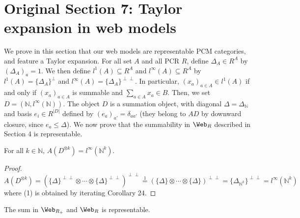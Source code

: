 \section*{Original Section 7: Taylor expansion in web models}
We prove in this section that our web models are representable PCM categories, and feature a Taylor expansion. For all set $A$ and all PCR $R$, define $\Delta_A\in R^A$ by $(\Delta_A)_a=1$. We then define $l^1(A)\subseteq R^A$ and $l^\infty(A)\subseteq R^A$ by $l^1(A)=\{\Delta_A\}^\perp$ and $l^\infty(A)=\{\Delta_A\}^{\perp\perp}$. In particular, $(x_a)_{a\in A}\in l^1(A)$ if and only if $(x_a)_{a\in A}$ is summable and $\sum_{a\in A}x_a\in B$. Then, we set $D=(\mathbb N,l^\infty(\mathbb N))$.
The object $D$ is a summation object, with diagonal $\Delta=\Delta_{\mathbb N}$ and basis $e_i\in R^{|D|}$ defined by $(e_a)_{a'}=\delta_{aa'}$ (they belong to $AD$ by downward closure, since $e_a\leq\Delta$). We now prove that the summability in $\Web_R$ described in Section 4 is representable.
\begin{originallemma}[58] For all $k\in\mathbb N$, $A(D^{\otimes k})=l^\infty(\mathbb N^k)$.\end{originallemma}
\begin{proof}$A(D^{\otimes k})=(\{\Delta\}^{\perp\perp}\otimes\cdots\otimes\{\Delta\}^{\perp\perp})^{\perp\perp}\mathrel{\stackrel{1}{=}}(\{\Delta\}\otimes\cdots\otimes\{\Delta\})^{\perp\perp}=\{\Delta_{\mathbb N^k}\}^{\perp\perp}=l^\infty(\mathbb N^k)$ where (1) is obtained by iterating Corollary 24.\end{proof}
\begin{originalthm}[59] The sum in $\Web_{R_+}$ and $\Web_R$ is representable.\end{originalthm}
